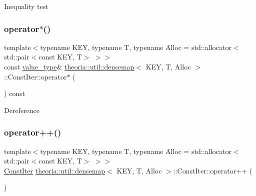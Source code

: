 Inequality test \mbox{\label{classtheoria_1_1util_1_1densemap_1_1ConstIter_ae0b3f11bfbeb4ef1335da2eb021d1de8}} 
\subsubsection{\texorpdfstring{operator$\ast$()}{operator*()}}
{\footnotesize\ttfamily template$<$typename K\+EY, typename T, typename Alloc = std\+::allocator$<$std\+::pair$<$const K\+E\+Y, T$>$ $>$$>$ \\
const \hyperlink{classtheoria_1_1util_1_1densemap_1_1ConstIter_a061fb76ecf5498d6033472fa66635d4a}{value\+\_\+type}\& \hyperlink{classtheoria_1_1util_1_1densemap}{theoria\+::util\+::densemap}$<$ K\+EY, T, Alloc $>$\+::Const\+Iter\+::operator$\ast$ (\begin{DoxyParamCaption}{ }\end{DoxyParamCaption}) const\hspace{0.3cm}{\ttfamily [inline]}}

Dereference \mbox{\label{classtheoria_1_1util_1_1densemap_1_1ConstIter_a7dba18b534ffdf71354b4b5789aea3a1}} 
\subsubsection{\texorpdfstring{operator++()}{operator++()}\hspace{0.1cm}{\footnotesize\ttfamily [1/2]}}
{\footnotesize\ttfamily template$<$typename K\+EY, typename T, typename Alloc = std\+::allocator$<$std\+::pair$<$const K\+E\+Y, T$>$ $>$$>$ \\
\hyperlink{classtheoria_1_1util_1_1densemap_1_1ConstIter}{Const\+Iter} \hyperlink{classtheoria_1_1util_1_1densemap}{theoria\+::util\+::densemap}$<$ K\+EY, T, Alloc $>$\+::Const\+Iter\+::operator++ (\begin{DoxyParamCaption}{ }\end{DoxyParamCaption})\hspace{0.3cm}{\ttfamily [inline]}}

